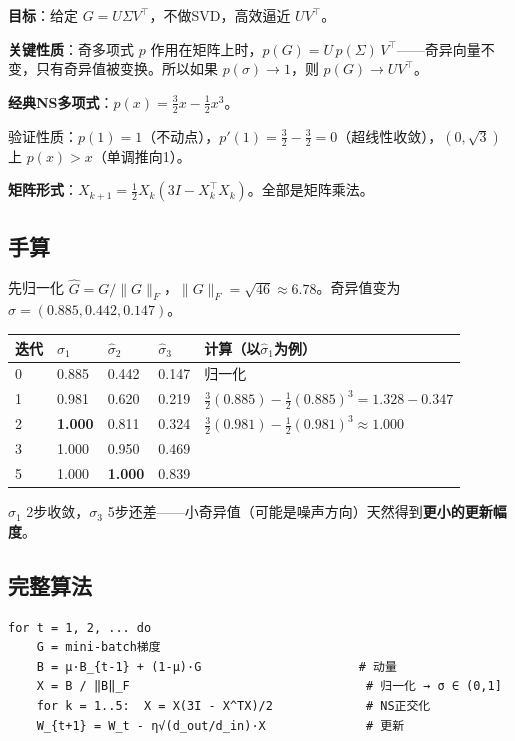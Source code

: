 \documentclass[12pt,a4paper]{article}
\begin{document}
\textbf{目标}：给定 $G = U\Sigma V^\top$，不做SVD，高效逼近 $UV^\top$。

\textbf{关键性质}：奇多项式 $p$ 作用在矩阵上时，$p(G) = U\,p(\Sigma)\,V^\top$——奇异向量不变，只有奇异值被变换。所以如果 $p(\sigma) \to 1$，则 $p(G) \to UV^\top$。

\textbf{经典NS多项式}：$p(x) = \frac{3}{2}x - \frac{1}{2}x^3$。

验证性质：$p(1) = 1$（不动点），$p'(1) = \frac{3}{2} - \frac{3}{2} = 0$（超线性收敛），$(0,\sqrt{3})$ 上 $p(x) > x$（单调推向1）。

\textbf{矩阵形式}：$X_{k+1} = \frac{1}{2}X_k(3I - X_k^\top X_k)$。全部是矩阵乘法。


\subsection{手算}

先归一化 $\hat{G} = G/\|G\|_F$，$\|G\|_F = \sqrt{46} \approx 6.78$。奇异值变为 $\hat\sigma = (0.885, 0.442, 0.147)$。








\begin{center}\small
\begin{longtable}{|l|l|l|l|l|}
\hline
迭代 & $\hat\sigma_1$ & $\hat\sigma_2$ & $\hat\sigma_3$ & 计算（以$\hat\sigma_1$为例） \\
\hline
0 & 0.885 & 0.442 & 0.147 & 归一化 \\
1 & 0.981 & 0.620 & 0.219 & $\frac{3}{2}(0.885)-\frac{1}{2}(0.885)^3 = 1.328-0.347$ \\
2 & \textbf{1.000} & 0.811 & 0.324 & $\frac{3}{2}(0.981)-\frac{1}{2}(0.981)^3 \approx 1.000$ \\
3 & 1.000 & 0.950 & 0.469 &  \\
5 & 1.000 & \textbf{1.000} & 0.839 &  \\
\hline
\end{longtable}
\end{center}


$\sigma_1$ 2步收敛，$\sigma_3$ 5步还差——小奇异值（可能是噪声方向）天然得到\textbf{更小的更新幅度}。


\subsection{完整算法}


\begin{lstlisting}
for t = 1, 2, ... do
    G = mini-batch梯度
    B = μ·B_{t-1} + (1-μ)·G                      # 动量
    X = B / ‖B‖_F                                 # 归一化 → σ ∈ (0,1]
    for k = 1..5:  X = X(3I - X^TX)/2             # NS正交化
    W_{t+1} = W_t - η√(d_out/d_in)·X              # 更新
\end{lstlisting}
\end{document}

